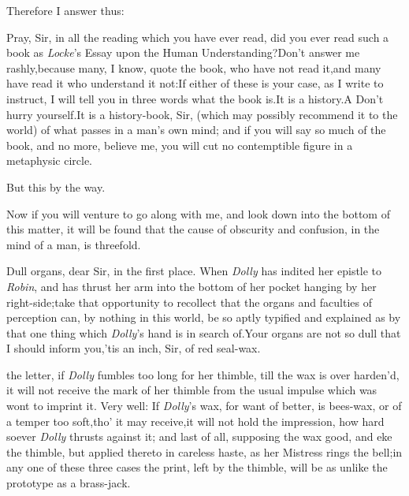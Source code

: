 \documentclass{article}
\begin{document}
\tsh Therefore I answer thus:

Pray, Sir, in all the reading which you have ever read, did you
ever read such a book as \textit{Locke}’s Essay upon the Human
Understanding?\tsh Don’t answer me rashly,\tsk because many, I
know, quote the book, who have not read it,\tsk and many have
read it who understand it not:\tsk If either of these is your
case, as I write to instruct, I will tell you in three words
what the book is.\tsk It is a history.\tsk A\break
{}
Don’t hurry yourself.\tsk It is a
history-book, Sir, (which may possibly recommend it to the
world) of what passes in a man’s own mind; and if you will say
so much of the book, and no more, believe me, you will cut no
contemptible figure in a metaphysic circle.

But this by the way.

Now if you will venture to go along with me, and look down into
the bottom of this matter, it will be found that the cause of
obscurity and confusion, in the mind of a man, is threefold.

Dull organs, dear Sir, in the first place. 
When \textit{Dolly} has indited her epistle to \textit{Robin},
and has thrust her arm into the bottom of her pocket hanging by
her\break
right-side;\tsk take that opportunity to recollect that the
organs and faculties of perception can, by nothing in this
world, be so aptly typified and explained as by that one thing
which \textit{Dolly}’s hand is in search of.\tsk Your organs are
not so dull that I should inform you,\tsk ’tis an inch, Sir, of
red seal-wax.

 the letter, if \textit{Dolly}
fumbles too long for her thimble, till the wax is over harden’d, it
will not receive the mark of her thimble from the usual impulse
which was wont to imprint it. Very well: If \textit{Dolly}’s
wax, for want of better, is bees-wax, or of a temper too
soft,\tsk tho’ it may receive,\tsk it will not hold the
impression, how hard soever \textit{Dolly} thrusts against it; and
last of all, supposing the wax good, and eke the thimble, but
applied thereto in careless haste, as her Mistress rings the bell;\tsh in any one of
these three cases the print, left by the thimble, will be as unlike
the prototype as a brass-jack.
\end{document}
